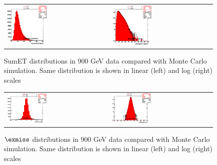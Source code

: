 \begin{figure}[h!]
 \centering
 \begin{tabular}{ll}
  \includegraphics[width=0.40\textwidth]{plots_DataVsMC_MB_900GeV/h_caloSumet_lin.eps} &
  \includegraphics[width=0.40\textwidth]{plots_DataVsMC_MB_900GeV/h_caloSumet.eps} \\
\end{tabular}
\caption{SumET distributions in 900 GeV data compared
  with Monte Carlo simulation. Same distribution is shown in linear (left) and log (right) scales
  \label{fig:DataVsMC_MB_900_2}}
\end{figure}

\begin{figure}[h!]
 \centering
 \begin{tabular}{ll}
  \includegraphics[width=0.40\textwidth]{plots_DataVsMC_MB_900GeV/h_calometPx_lin.eps} &
  \includegraphics[width=0.40\textwidth]{plots_DataVsMC_MB_900GeV/h_calometPx.eps} \\
 \end{tabular}
 \caption{$\exmiss$ distributions in 900 GeV data compared
   with Monte Carlo simulation. Same distribution is shown in linear (left) and log (right) scales
          \label{fig:DataVsMC_MB_900_3}}
\end{figure}

